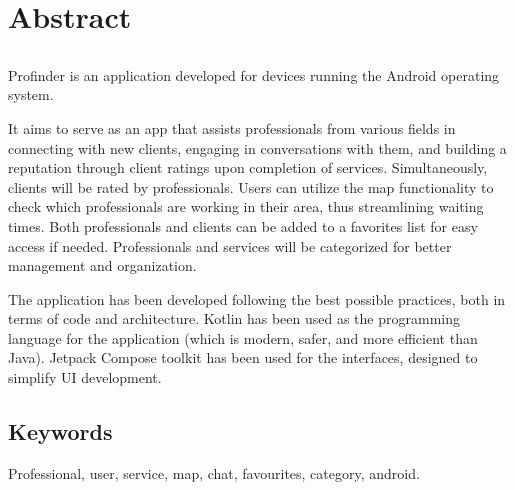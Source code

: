 \chapter*{Abstract}

\section*{\tituloPortadaEngVal}

Profinder is an application developed for devices running the Android operating system. 

It aims to serve as an app that assists professionals from various fields in connecting with new clients, engaging in conversations with them, and building a reputation through client ratings upon completion of services. Simultaneously, clients will be rated by professionals. Users can utilize the map functionality to check which professionals are working in their area, thus streamlining waiting times. Both professionals and clients can be added to a favorites list for easy access if needed. Professionals and services will be categorized for better management and organization.

The application has been developed following the best possible practices, both in terms of code and architecture. Kotlin has been used as the programming language for the application (which is modern, safer, and more efficient than Java). Jetpack Compose toolkit has been used for the interfaces, designed to simplify UI development.


\section*{Keywords}
\noindent Professional, user, service, map, chat, favourites, category, android.



